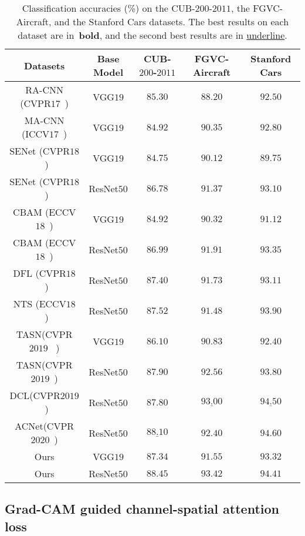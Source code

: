 \documentclass{article}
\begin{document}
\begin{table*}[!t]
    
    \centering
    \caption{Classification accuracies (\%) on the CUB-$200$-$2011$, the FGVC-Aircraft, and the Stanford Cars datasets. The best results on each dataset are in~\textbf{bold}, and the second best results are in \underline{underline}.}

    \begin{tabular}{|c|c|c|c|c|}
        \hline
        Datasets& Base Model & CUB-$200$-$2011$ & FGVC-Aircraft & Stanford Cars \\ 
        \hline 
        \hline
        RA-CNN (CVPR$17$~\cite{RA-CNN}) & VGG$19$ & $85.30$ & $88.20$ &$92.50$ \\
        MA-CNN (ICCV$17$~\cite{MA-CNN}) & VGG$19$ &$84.92$ & $90.35$ &$92.80$ \\
        SENet (CVPR$18$~\cite{SENet}) & VGG$19$ & $84.75$ & $90.12$&$89.75$  \\ 
        SENet (CVPR$18$~\cite{SENet}) & ResNet$50$ & $86.78$ & $91.37$ &$93.10$ \\
        CBAM (ECCV$18$~\cite{CBAM})  & VGG$19$ & $84.92$ & $90.32$ &$91.12$ \\
        CBAM (ECCV$18$~\cite{CBAM})  & ResNet$50$ & $86.99$ & $91.91$ &$93.35$ \\
        DFL (CVPR$18$~\cite{DFL}) & ResNet$50$ & $87.40$ & $91.73$ &$93.11$ \\
        NTS (ECCV$18$~\cite{NTS}) & ResNet$50$ & $87.52$ & $91.48$ &$93.90$\\
        TASN(CVPR$2019$~\cite{TASN} )& VGG$19$ & $86.10$ & $90.83$ &$92.40$ \\
        TASN(CVPR$2019$~\cite{TASN})& ResNet$50$ & $87.90$ & $92.56$ &$93.80$ \\
        DCL(CVPR$2019$~\cite{DCL})& ResNet$50$ & $87.80$ & $\underline{93.00}$ &$\underline{94.50}$ \\
        ACNet(CVPR$2020$~\cite{ACNet})& ResNet$50$ & $\underline{88.10}$ & $92.40$ &$\boldsymbol{94.60}$ \\
        \hline
        Ours & VGG$19$ & $87.34$ & $91.55$ &$93.32$\\
        Ours & ResNet$50$ & $\boldsymbol{88.45}$ & $\boldsymbol{93.42}$ &$94.41$\\
        \hline
    \end{tabular}
    \label{tab:results}
\end{table*}
\vspace{-2mm}
\subsection{Grad-CAM guided channel-spatial attention loss}
\end{document}
